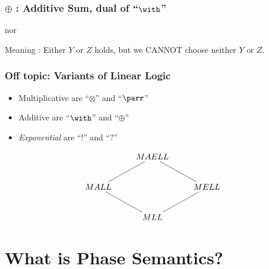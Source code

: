 \documentclass[dvipdfmx,cjk]{beamer}
\theoremstyle{example}
\begin{document}
\begin{frame}
  \frametitle{$\oplus$ : Additive Sum, dual of ``$\with$''} 
  
  \begin{prooftree}

    
  \end{prooftree}

  nor

  \begin{prooftree}

    
  \end{prooftree} 

  Meaning : Either $Y$ or $Z$ holds, but we CANNOT choose neither $Y$ or $Z$.

\end{frame}

\begin{frame}
  \frametitle{Off topic: Variants of Linear Logic}

  \begin{itemize}
      \item Multiplicative are ``$\otimes$'' and ``$\parr$'' 
      \item Additive are ``$\with$''   and ``$\oplus$''
      \item \textit{Exponential} are ``$!$'' and ``$?$''
  \end{itemize}

  \[
      \xymatrix{
        & MAELL \ar@{-}[dr] \ar@{-}[dl] \\
        MALL \ar@{-}[dr] & & MELL \ar@{-}[dl] \\
        & MLL
      }
   \]      
  
\end{frame}

\section{What is Phase Semantics?}
                          
\end{document}
